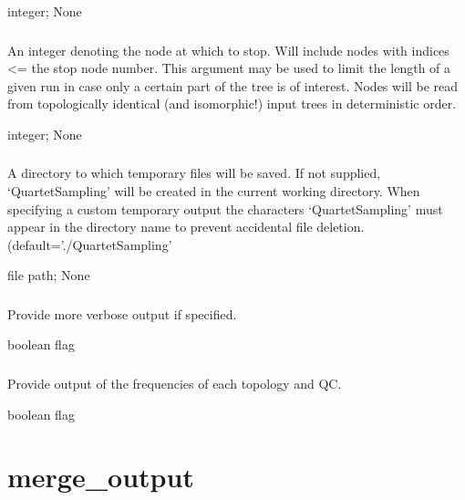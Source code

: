 \documentclass[letterpaper,12pt,english]{sphinxmanual}
\begin{document}
 integer;  None


\subsubsection{}
\label{\detokenize{prog_desc:stop-node-number}}
 An integer denoting the node at which to stop. Will include nodes with indices \textless{}= the stop node number. This argument may be used to limit the length of a given run in case only a certain part of the tree is of interest. Nodes will be read from topologically identical (and isomorphic!) input trees in deterministic order.

 integer;  None


\subsubsection{}
\label{\detokenize{prog_desc:temp-dir}}
 A directory to which temporary files will be saved. If not supplied, ‘QuartetSampling’ will be created in the current working directory. When specifying a custom temporary output the characters ‘QuartetSampling’ must appear in the directory name to prevent accidental file deletion. (default=’./QuartetSampling’

 file path;  None


\subsubsection{}
\label{\detokenize{prog_desc:verbose}}
 Provide more verbose output if specified.

 boolean flag


\subsubsection{}
\label{\detokenize{prog_desc:verbout}}
 Provide output of the frequencies of each topology and QC.

 boolean flag


\section{merge\_output}
\label{\detokenize{prog_desc:merge-output}}
\end{document}
